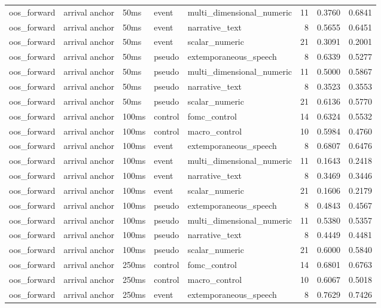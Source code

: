 \begin{tabular}{lllllrrr}
oos_forward & arrival anchor & 50ms & event & multi_dimensional_numeric & 11 & 0.3760 & 0.6841 \\
oos_forward & arrival anchor & 50ms & event & narrative_text & 8 & 0.5655 & 0.6451 \\
oos_forward & arrival anchor & 50ms & event & scalar_numeric & 21 & 0.3091 & 0.2001 \\
oos_forward & arrival anchor & 50ms & pseudo & extemporaneous_speech & 8 & 0.6339 & 0.5277 \\
oos_forward & arrival anchor & 50ms & pseudo & multi_dimensional_numeric & 11 & 0.5000 & 0.5867 \\
oos_forward & arrival anchor & 50ms & pseudo & narrative_text & 8 & 0.3523 & 0.3553 \\
oos_forward & arrival anchor & 50ms & pseudo & scalar_numeric & 21 & 0.6136 & 0.5770 \\
oos_forward & arrival anchor & 100ms & control & fomc_control & 14 & 0.6324 & 0.5532 \\
oos_forward & arrival anchor & 100ms & control & macro_control & 10 & 0.5984 & 0.4760 \\
oos_forward & arrival anchor & 100ms & event & extemporaneous_speech & 8 & 0.6807 & 0.6476 \\
oos_forward & arrival anchor & 100ms & event & multi_dimensional_numeric & 11 & 0.1643 & 0.2418 \\
oos_forward & arrival anchor & 100ms & event & narrative_text & 8 & 0.3469 & 0.3446 \\
oos_forward & arrival anchor & 100ms & event & scalar_numeric & 21 & 0.1606 & 0.2179 \\
oos_forward & arrival anchor & 100ms & pseudo & extemporaneous_speech & 8 & 0.4843 & 0.4567 \\
oos_forward & arrival anchor & 100ms & pseudo & multi_dimensional_numeric & 11 & 0.5380 & 0.5357 \\
oos_forward & arrival anchor & 100ms & pseudo & narrative_text & 8 & 0.4449 & 0.4481 \\
oos_forward & arrival anchor & 100ms & pseudo & scalar_numeric & 21 & 0.6000 & 0.5840 \\
oos_forward & arrival anchor & 250ms & control & fomc_control & 14 & 0.6801 & 0.6763 \\
oos_forward & arrival anchor & 250ms & control & macro_control & 10 & 0.6067 & 0.5018 \\
oos_forward & arrival anchor & 250ms & event & extemporaneous_speech & 8 & 0.7629 & 0.7426 \\

\end{tabular}
